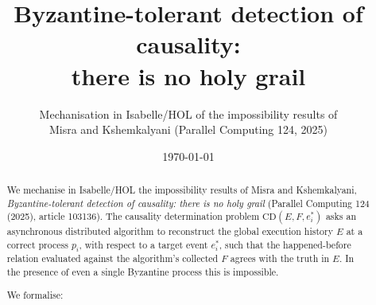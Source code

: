 \documentclass[11pt,a4paper]{article}
\title{Byzantine-tolerant detection of causality:\\
       there is no holy grail}
\author{Mechanisation in Isabelle/HOL of the impossibility results of\\
        Misra and Kshemkalyani (Parallel Computing 124, 2025)}
\date{\today}
\begin{document}
\maketitle

\begin{abstract}
We mechanise in Isabelle/HOL the impossibility results of
Misra and Kshemkalyani, \emph{Byzantine-tolerant detection of
causality: there is no holy grail} (Parallel Computing 124 (2025),
article 103136).  The causality determination problem
$\mathrm{CD}(E,F,e_i^*)$ asks an asynchronous distributed algorithm
to reconstruct the global execution history $E$ at a correct
process $p_i$, with respect to a target event $e_i^*$, such that
the happened-before relation evaluated against the algorithm's
collected $F$ agrees with the truth in $E$.  In the presence of
even a single Byzantine process this is impossible.

We formalise:


\end{abstract}
\end{document}
